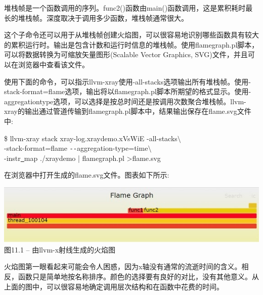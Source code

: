堆栈帧是一个函数调用的序列。func2()函数由main()函数调用，这是累积耗时最长的堆栈帧。深度取决于调用多少函数，堆栈帧通常很大。\par

这个子命令还可以用于从堆栈帧创建火焰图，可以很容易地识别哪些函数具有较大的累积运行时。输出是包含计数和运行时信息的堆栈帧。使用flamegraph.pl脚本，可以将数据转换为可缩放矢量图形(Scalable Vector Graphics, SVG)文件，并且可以在浏览器中查看该文件。\par

使用下面的命令，可以指示llvm-xray使用-all-stacks选项输出所有堆栈帧。使用-stack-format=\allowbreak flame选项，输出将以flamegraph.pl脚本所期望的格式显示。使用-aggregationtype选项，可以选择是按总时间还是按调用次数聚合堆栈帧。llvm-xray的输出通过管道传输到flamegraph.pl脚本中，结果输出保存在flame.svg文件中:\par

\begin{tcolorbox}[colback=white,colframe=black]
\$ llvm-xray stack xray-log.xraydemo.xVsWiE -all-stacks$\setminus$ \\
\hspace*{0.5cm}-stack-format=flame \verb|--|aggregation-type=time$\setminus$ \\
\hspace*{0.5cm}-instr\underline{~}map ./xraydemo | flamegraph.pl >flame.svg
\end{tcolorbox}

在浏览器中打开生成的flame.svg文件。图表如下所示:\par

\hspace*{\fill} \par %
\begin{center}
\includegraphics[width=1\textwidth]{content/3/chapter11/images/1.jpg}\\
图11.1 – 由llvm-x射线生成的火焰图
\end{center}

火焰图第一眼看起来可能会令人困惑，因为x轴没有通常的流逝时间的含义。相反，函数只是简单地按名称排序。颜色的选择要有良好的对比，没有其他意义。从上面的图中，可以很容易地确定调用层次结构和在函数中花费的时间。\par

